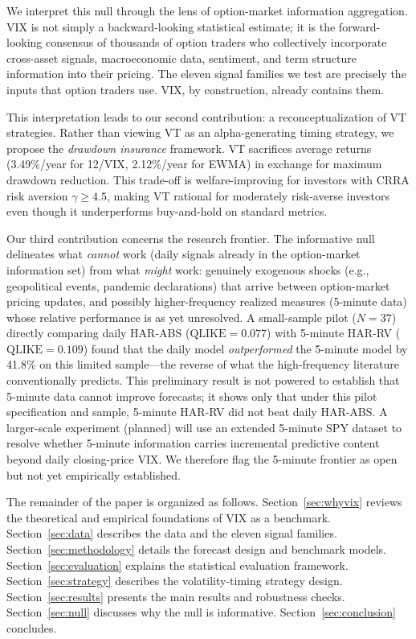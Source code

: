 \documentclass[12pt,a4paper]{article}
\begin{document}
We interpret this null through the lens of option-market information aggregation. VIX is not simply a backward-looking statistical estimate; it is the forward-looking consensus of thousands of option traders who collectively incorporate cross-asset signals, macroeconomic data, sentiment, and term structure information into their pricing. The eleven signal families we test are precisely the inputs that option traders use. VIX, by construction, already contains them.

This interpretation leads to our second contribution: a reconceptualization of VT strategies. Rather than viewing VT as an alpha-generating timing strategy, we propose the \emph{drawdown insurance} framework. VT sacrifices average returns (3.49\%/year for 12/VIX, 2.12\%/year for EWMA) in exchange for maximum drawdown reduction. This trade-off is welfare-improving for investors with CRRA risk aversion $\gamma \geq 4.5$, making VT rational for moderately risk-averse investors even though it underperforms buy-and-hold on standard metrics.

Our third contribution concerns the research frontier. The informative null delineates what \emph{cannot} work (daily signals already in the option-market information set) from what \emph{might} work: genuinely exogenous shocks (e.g., geopolitical events, pandemic declarations) that arrive between option-market pricing updates, and possibly higher-frequency realized measures (5-minute data) whose relative performance is as yet unresolved. A small-sample pilot ($N = 37$) directly comparing daily HAR-ABS ($\text{QLIKE} = 0.077$) with 5-minute HAR-RV ($\text{QLIKE} = 0.109$) found that the daily model \emph{outperformed} the 5-minute model by 41.8\% on this limited sample---the reverse of what the high-frequency literature conventionally predicts. This preliminary result is not powered to establish that 5-minute data cannot improve forecasts; it shows only that under this pilot specification and sample, 5-minute HAR-RV did not beat daily HAR-ABS. A larger-scale experiment (planned) will use an extended 5-minute SPY dataset to resolve whether 5-minute information carries incremental predictive content beyond daily closing-price VIX. We therefore flag the 5-minute frontier as open but not yet empirically established.

The remainder of the paper is organized as follows. Section~\ref{sec:whyvix} reviews the theoretical and empirical foundations of VIX as a benchmark. Section~\ref{sec:data} describes the data and the eleven signal families. Section~\ref{sec:methodology} details the forecast design and benchmark models. Section~\ref{sec:evaluation} explains the statistical evaluation framework. Section~\ref{sec:strategy} describes the volatility-timing strategy design. Section~\ref{sec:results} presents the main results and robustness checks. Section~\ref{sec:null} discusses why the null is informative. Section~\ref{sec:conclusion} concludes.
\end{document}
